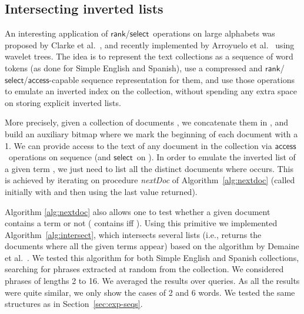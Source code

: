 \documentclass[11pt]{article}
\newcommand{\access}
    {\ensuremath{\mathsf{access}}}
\newcommand{\rank}
    {\ensuremath{\mathsf{rank}}}
\newcommand{\select}
    {\ensuremath{\mathsf{select}}}
\begin{document}
\begin{table}[t]
{\begin{tabular}
\subsection{Intersecting inverted lists}
\label{sec:exp-invl}

An interesting application of \rank/\select\ operations on large alphabets
was proposed by Clarke et al.~\cite{CCT00}, and recently implemented by
Arroyuelo et al.~\cite{AGO10} using wavelet trees. The idea is to represent
the text collections as a sequence of word tokens (as done for Simple English
and Spanish), use a compressed and \rank/\select/\access-capable sequence 
representation for them, and use those operations to emulate an inverted index 
on the collection, without spending any extra space on storing explicit 
inverted lists. 

More precisely, given a collection of  documents , we
concatenate them in , and build
an auxiliary bitmap  where we mark the
beginning of each document with a 1. We can provide access to the text of any
document in the collection via \access\ operations on sequence
 (and \select\ on ). In order to emulate the inverted list of 
a given term , we just need to list all the distinct documents where  
occurs. This is achieved by iterating on procedure 
{\em nextDoc} of Algorithm~\ref{alg:nextdoc} (called initially with 
 and then using the last  value returned).

\begin{algorithm}[htb]
\Input{}

\;
\;
\Return{}
\caption{Function {\em nextDoc}, retrieves the next document 
after  containing . The  axis starts at the entropy of the sequence.}
\label{alg:nextdoc}
\end{algorithm}

Algorithm \ref{alg:nextdoc} also allows one to test whether a given document 
contains a term or not ( contains  iff ). 
Using this primitive we implemented Algorithm~\ref{alg:intersect}, which
intersects several lists (i.e., returns the documents where all the given
terms appear) based on the algorithm by Demaine et al.~\cite{DLM00}. We
tested this algorithm for both Simple English and Spanish collections,
searching for phrases extracted at random from the collection. We considered 
phrases of lengths 2 to 16. We averaged the results over  queries. As all 
the results were quite similar, we only show the cases of 2 and 6 words.
We tested the same structures as in Section~\ref{sec:exp-seqs}.


\end{tabular}}
\end{table}
\end{document}
